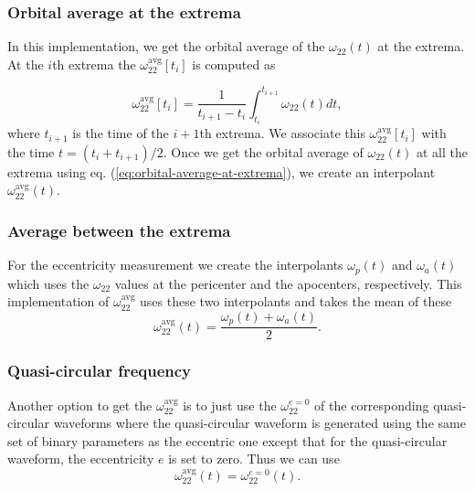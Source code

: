 \documentclass[aps,prd,amsmath,floats,floatfix, twocolumn,
superscriptaddress,nofootinbib,showpacs]{revtex4-1}
\newcommand{\avgOmega}{\omega^{\text{avg}}_{22}}
\newcommand{\zeroOmega}{\omega_{22}^{e=0}}
\begin{document}
\subsubsection{Orbital average at the extrema}
\label{sec:orbital-average-at-the-extrema}
In this implementation, we get the orbital average of the
$\omega_{22}(t)$ at the extrema. At the $i$th extrema the
$\avgOmega[t_i]$ is computed as

\begin{equation}
  \label{eq:orbital-average-at-extrema}
  \avgOmega[t_i] = \frac{1}{t_{i+1} -
    t_{i}}\int_{t_{i}}^{t_{i+1}}\omega_{22}(t) dt,
\end{equation}
where $t_{i+1}$ is the time of the $i+1$th extrema. We associate this
$\avgOmega[t_{i}]$ with the time $t = (t_i +
t_{i+1})/2$. Once we get the orbital average of $\omega_{22}(t)$ at
all the extrema using eq. (\ref{eq:orbital-average-at-extrema}), we
create an interpolant $\avgOmega(t)$.

\subsubsection{Average between the extrema}
\label{sec:average-between-the-extrema}
For the eccentricity measurement we create the interpolants
$\omega_{p}(t)$ and $\omega_a(t)$ which uses the $\omega_{22}$ values
at the pericenter and the apocenters, respectively. This
implementation of $\avgOmega$ uses these two
interpolants and takes the mean of these
\begin{equation}
  \label{eq:average-between-extrema}
  \avgOmega(t) = \frac{\omega_{p}(t) + \omega_{a}(t)}{2}.
\end{equation}

\subsubsection{Quasi-circular frequency}
\label{sec:quasi-circular-frequency}
Another option to get the $\avgOmega$ is to just use
the $\zeroOmega$ of the corresponding quasi-circular waveforms
where the quasi-circular waveform is generated using the same set of
binary parameters as the eccentric one except that for the
quasi-circular waveform, the eccentricity $e$ is set to zero. Thus we
can use
\begin{equation}
  \label{eq:quasi-circular-frequency}
  \avgOmega(t) = \zeroOmega(t).
\end{equation}

\end{document}

